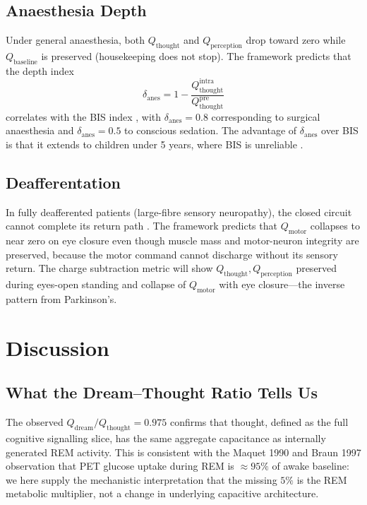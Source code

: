 \documentclass[11pt,twocolumn,a4paper]{article}
\theoremstyle{definition}
\theoremstyle{remark}
\newcommand{\Qth}{Q_{\mathrm{thought}}}
\newcommand{\Qmo}{Q_{\mathrm{motor}}}
\newcommand{\Qpe}{Q_{\mathrm{perception}}}
\newcommand{\Qba}{Q_{\mathrm{baseline}}}
\newcommand{\Qdr}{Q_{\mathrm{dream}}}
\begin{document}
\subsection{Anaesthesia Depth}

Under general anaesthesia, both $\Qth$ and $\Qpe$ drop toward zero
while $\Qba$ is preserved (housekeeping does not stop). The
framework predicts that the depth index
\begin{equation}
\delta_{\mathrm{anes}} = 1 - \frac{\Qth^{\mathrm{intra}}}{\Qth^{\mathrm{pre}}}
\end{equation}
correlates with the BIS index \citep{kelley2003}, with
$\delta_{\mathrm{anes}}=0.8$ corresponding to surgical anaesthesia
and $\delta_{\mathrm{anes}}=0.5$ to conscious sedation. The
advantage of $\delta_{\mathrm{anes}}$ over BIS is that it
extends to children under 5 years, where BIS is unreliable
\citep{davidson2005}.

\subsection{Deafferentation}

In fully deafferented patients (large-fibre sensory neuropathy),
the closed circuit cannot complete its return path
\citep{rothwell1982,cole1995}. The framework predicts that $\Qmo$
collapses to near zero on eye closure even though muscle mass and
motor-neuron integrity are preserved, because the motor command
cannot discharge without its sensory return. The charge subtraction
metric will show $\Qth,\Qpe$ preserved during eyes-open standing and
collapse of $\Qmo$ with eye closure---the inverse pattern from
Parkinson's.

\section{Discussion}

\subsection{What the Dream--Thought Ratio Tells Us}

The observed $\Qdr/\Qth = 0.975$ confirms that thought, defined as
the full cognitive signalling slice, has the same aggregate capacitance
as internally generated REM activity. This is consistent with the
Maquet 1990 and Braun 1997 observation that PET glucose uptake during
REM is $\approx 95\%$ of awake baseline: we here supply the
mechanistic interpretation that the missing $5\%$ is the
REM metabolic multiplier, not a change in underlying capacitive
architecture.
\end{document}
